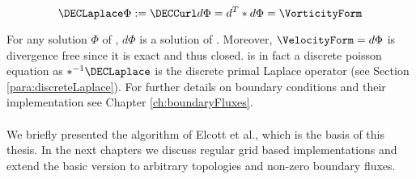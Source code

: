 \begin{equation}
\label{eq:ComplexCurl}
\DECLaplace \Phi := \DECCurl d \Phi = d^T * d \Phi = \VorticityForm
\end{equation}

For any solution $\Phi$ of , $d \Phi$ is a solution of .
Moreover, $\VelocityForm = d \Phi$ is divergence free since it is exact and thus closed.
 is in fact a discrete poisson equation as $*^{-1} \DECLaplace$ is the discrete primal Laplace operator (see Section \ref{para:discreteLaplace}).
For further details on boundary conditions and their implementation see Chapter \ref{ch:boundaryFluxes}.

\paragraph*{}
We briefly presented the algorithm of Elcott et al., which is the basis of this thesis.
In the next chapters we discuss regular grid based implementations and extend the basic version to arbitrary topologies and non-zero boundary fluxes.












